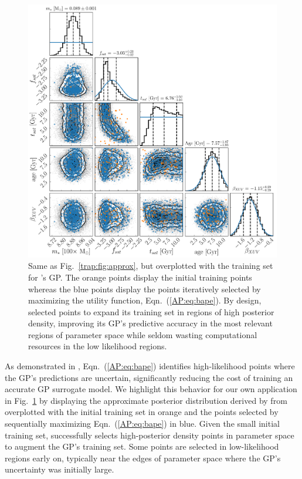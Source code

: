 \begin{figure}
	\includegraphics[width=\textwidth]{points.pdf}
   \caption{Same as Fig.~\ref{trap:fig:approx}, but overplotted with the training set for \approxposterior's GP. The orange points display the initial training points whereas the blue points display the points iteratively selected by maximizing the \citet{Kandasamy2017} utility function, Eqn.~(\ref{AP:eq:bape}). By design, \approxposterior selected points to expand its training set in regions of high posterior density, improving its GP's predictive accuracy in the most relevant regions of parameter space while seldom wasting computational resources in the low likelihood regions.}%
    \label{AP:fig:points}%
\end{figure}

As demonstrated in \citet{Kandasamy2017}, Eqn.~(\ref{AP:eq:bape}) identifies high-likelihood points where the GP's predictions are uncertain, significantly reducing the cost of training an accurate GP surrogate model. We highlight this behavior for our own application in Fig.~\ref{AP:fig:points} by displaying the approximate posterior distribution derived by \approxposterior from \citet{Fleming2020} overplotted with the initial training set in orange and the points selected by sequentially maximizing Eqn.~(\ref{AP:eq:bape}) in blue. Given the small initial training set, \approxposterior successfully selects high-posterior density points in parameter space to augment the GP's training set. Some points are selected in low-likelihood regions early on, typically near the edges of parameter space where the GP's uncertainty was initially large.

